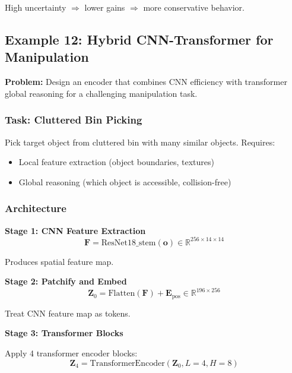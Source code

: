 High uncertainty $\Rightarrow$ lower gains $\Rightarrow$ more conservative behavior.


\subsection{Example 12: Hybrid CNN-Transformer for Manipulation}

\textbf{Problem:} Design an encoder that combines CNN efficiency with transformer global reasoning for a challenging manipulation task.

\subsubsection{Task: Cluttered Bin Picking}

Pick target object from cluttered bin with many similar objects. Requires:
\begin{itemize}
    \item Local feature extraction (object boundaries, textures)
    \item Global reasoning (which object is accessible, collision-free)
\end{itemize}

\subsubsection{Architecture}

\textbf{Stage 1: CNN Feature Extraction}
\begin{equation}
\mathbf{F} = \text{ResNet18\_stem}(\mathbf{o}) \in \mathbb{R}^{256 \times 14 \times 14}
\label{eq:cnn_features}
\end{equation}

Produces spatial feature map.

\textbf{Stage 2: Patchify and Embed}
\begin{equation}
\mathbf{Z}_0 = \text{Flatten}(\mathbf{F}) + \mathbf{E}_{\text{pos}} \in \mathbb{R}^{196 \times 256}
\label{eq:patchify}
\end{equation}

Treat CNN feature map as tokens.

\textbf{Stage 3: Transformer Blocks}

Apply 4 transformer encoder blocks:
\begin{equation}
\mathbf{Z}_4 = \text{TransformerEncoder}(\mathbf{Z}_0, L=4, H=8)
\label{eq:transformer_stage}
\end{equation}

